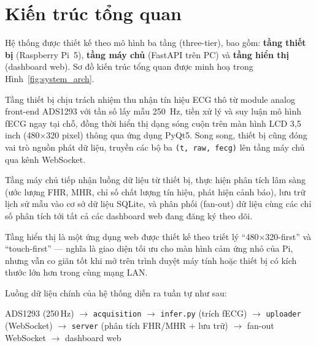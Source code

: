 \documentclass[../DoAn.tex]{subfiles}
\begin{document}
\section{Kiến trúc tổng quan}

Hệ thống được thiết kế theo mô hình ba tầng (three-tier), bao gồm: \textbf{tầng thiết bị} (Raspberry Pi~5), \textbf{tầng máy chủ} (FastAPI trên PC) và \textbf{tầng hiển thị} (dashboard web). Sơ đồ kiến trúc tổng quan được minh hoạ trong Hình~\ref{fig:system_arch}.

Tầng thiết bị chịu trách nhiệm thu nhận tín hiệu ECG thô từ module analog front-end ADS1293 với tần số lấy mẫu 250~Hz, tiền xử lý và suy luận mô hình fECG ngay tại chỗ, đồng thời hiển thị dạng sóng cuộn trên màn hình LCD 3{,}5 inch (480$\times$320 pixel) thông qua ứng dụng PyQt5. Song song, thiết bị cũng đóng vai trò nguồn phát dữ liệu, truyền các bộ ba \texttt{(t, raw, fecg)} lên tầng máy chủ qua kênh WebSocket.

Tầng máy chủ tiếp nhận luồng dữ liệu từ thiết bị, thực hiện phân tích lâm sàng (ước lượng FHR, MHR, chỉ số chất lượng tín hiệu, phát hiện cảnh báo), lưu trữ lịch sử mẫu vào cơ sở dữ liệu SQLite, và phân phối (fan-out) dữ liệu cùng các chỉ số phân tích tới tất cả các dashboard web đang đăng ký theo dõi.

Tầng hiển thị là một ứng dụng web được thiết kế theo triết lý ``480$\times$320-first'' và ``touch-first'' --- nghĩa là giao diện tối ưu cho màn hình cảm ứng nhỏ của Pi, nhưng vẫn co giãn tốt khi mở trên trình duyệt máy tính hoặc thiết bị có kích thước lớn hơn trong cùng mạng LAN.

Luồng dữ liệu chính của hệ thống diễn ra tuần tự như sau:

\begin{center}
\small
ADS1293 (250\,Hz) $\rightarrow$ \texttt{acquisition} $\rightarrow$ \texttt{infer.py} (trích fECG) $\rightarrow$ \texttt{uploader} (WebSocket) $\rightarrow$ \texttt{server} (phân tích FHR/MHR + lưu trữ) $\rightarrow$ fan-out WebSocket $\rightarrow$ dashboard web
\end{center}
\end{document}

